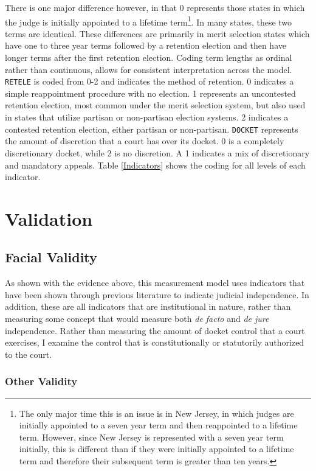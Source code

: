 \documentclass[12pt]{article}
\begin{document}
There is one major difference however, in that 0 represents those states in which the judge is initially appointed to a lifetime term\footnote{The only major time this is an issue is in New Jersey, in which judges are initially appointed to a seven year term and then reappointed to a lifetime term.  However, since New Jersey is represented with a seven year term initially, this is different than if they were initially appointed to a lifetime term and therefore their subsequent term is greater than ten years.}.  In many states, these two terms are identical.  These differences are primarily in merit selection states which have one to three year terms followed by a retention election and then have longer terms after the first retention election.  Coding term lengths as ordinal rather than continuous, allows for consistent interpretation across the model.  \texttt{RETELE} is coded from 0-2 and indicates the method of retention.  0 indicates a simple reappointment procedure with no election.  1 represents an uncontested retention election, most common under the merit selection system, but also used in states that utilize partisan or non-partisan election systems.  2 indicates a contested retention election, either partisan or non-partisan.  \texttt{DOCKET} represents the amount of discretion that a court has over its docket.  0 is a completely discretionary docket, while 2 is no discretion.  A 1 indicates a mix of discretionary and mandatory appeals. Table \ref{Indicators} shows the coding for all levels of each indicator. 



\newpage\section*{Validation}
\subsection*{Facial Validity}
As shown with the evidence above, this measurement model uses indicators that have been shown
through previous literature to indicate judicial independence. In addition, these are all indicators
that are institutional in nature, rather than measuring some concept that would measure both \textit{de
facto} and \textit{de jure} independence. Rather than measuring the amount of docket control that a court
exercises, I examine the control that is constitutionally or statutorily authorized to the court.


\subsubsection*{Other Validity}

\end{document}
